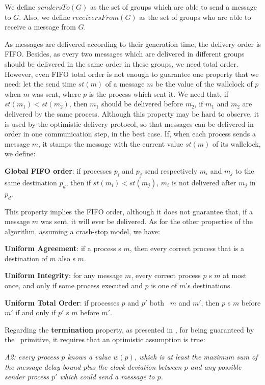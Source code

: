 \documentclass[times, 10pt]{article}
\begin{document}
We define $sendersTo(G)$ as the set of groups which are able to send a message to $G$. Also, we define $receiversFrom(G)$ as the set of groups who are able to receive a message from $G$.

As messages are delivered according to their generation time, the delivery order is FIFO. Besides, as every two messages which are delivered in different groups should be delivered in the same order in these groups, we need total order. However, even FIFO total order is not enough to guarantee one property that we need: let the send time $st(m)$ of a message $m$ be the value of the wallclock of $p$ when $m$ was sent, where $p$ is the process which sent it. We need that, if $st(m_1) < st(m_2)$, then $m_1$ should be delivered before $m_2$, if $m_1$ and $m_2$ are delivered by the same process. Although this property may be hard to observe, it is used by the optimistic delivery protocol, so that messages can be delivered in order in one communication step, in the best case. If, when each process sends a message $m$, it stamps the message with the current value $st(m)$ of its wallclock, we define:

\textbf{Global FIFO order}: if processes $p_i$ and $p_j$ send respectively $m_i$ and $m_j$ to the same destination $p_d$, then if $st(m_i) < st(m_j)$, $m_i$ is not delivered after $m_j$ in $p_d$.

This property implies the FIFO order, although it does not guarantee that, if a message $m$ was sent, it will ever be delivered. As for the other properties of the algorithm, assuming a crash-stop model, we have:

\textbf{Uniform Agreement}: if a process \cons{}s $m$, then every correct process that is a destination of $m$ also \cons{}s $m$.

\textbf{Uniform Integrity}: for any message $m$, every correct process $p$ \cons{}s $m$ at most once, and only if some process executed  and $p$ is one of $m$'s destinations.

\textbf{Uniform Total Order}: if processes $p$ and $p'$ both \cons\ $m$ and $m'$, then $p$ \cons{}s $m$ before $m'$ if and only if $p'$ \cons{}s $m$ before $m'$.

Regarding the \textbf{termination} property, as presented in \cite{rodrigues2000atomic}, for being guaranteed by the \cms\ primitive, it requires that an optimistic assumption is true:

\begin{center}
\emph{A2: every process $p$ knows a value $w(p)$, which is at least the maximum sum of the message delay bound plus the clock deviation between $p$ and any possible sender process $p'$ which could send a message to $p$.}
\end{center}
\end{document}
